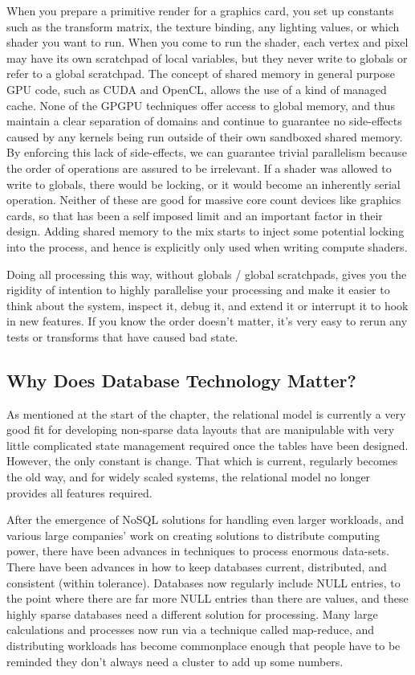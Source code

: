 \documentclass[a4paper,12pt]{book}
\begin{document}
When you prepare a primitive render for a graphics card, you set up constants such as the transform matrix, the texture binding, any lighting values, or which shader you want to run. When you come to run the shader, each vertex and pixel may have its own scratchpad of local variables, but they never write to globals or refer to a global scratchpad. The concept of shared memory in general purpose GPU code, such as CUDA and OpenCL, allows the use of a kind of managed cache. None of the GPGPU techniques offer access to global memory, and thus maintain a clear separation of domains and continue to guarantee no side-effects caused by any kernels being run outside of their own sandboxed shared memory. By enforcing this lack of side-effects, we can guarantee trivial parallelism because the order of operations are assured to be irrelevant. If a shader was allowed to write to globals, there would be locking, or it would become an inherently serial operation. Neither of these are good for massive core count devices like graphics cards, so that has been a self imposed limit and an important factor in their design. Adding shared memory to the mix starts to inject some potential locking into the process, and hence is explicitly only used when writing compute shaders.

Doing all processing this way, without globals / global scratchpads, gives you the rigidity of intention to highly parallelise your processing and make it easier to think about the system, inspect it, debug it, and extend it or interrupt it to hook in new features. If you know the order doesn't matter, it's very easy to rerun any tests or transforms that have caused bad state.

\subsection{Why Does Database Technology Matter?}

As mentioned at the start of the chapter, the relational model is currently a very good fit for developing non-sparse data layouts that are manipulable with very little complicated state management required once the tables have been designed. However, the only constant is change. That which is current, regularly becomes the old way, and for widely scaled systems, the relational model no longer provides all features required.

After the emergence of NoSQL solutions for handling even larger workloads, and various large companies' work on creating solutions to distribute computing power, there have been advances in techniques to process enormous data-sets. There have been advances in how to keep databases current, distributed, and consistent (within tolerance). Databases now regularly include NULL entries, to the point where there are far more NULL entries than there are values, and these highly sparse databases need a different solution for processing. Many large calculations and processes now run via a technique called map-reduce, and distributing workloads has become commonplace enough that people have to be reminded they don't always need a cluster to add up some numbers.
\end{document}

